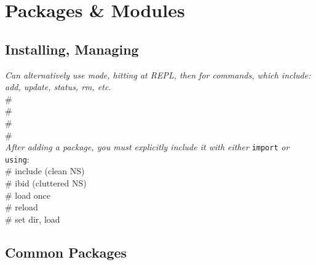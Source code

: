 \section{Packages \& Modules}

\subsection*{Installing, Managing}
\textit{Can alternatively use  mode, hitting \say{]} at REPL, then  for commands, which include: add, update, status, rm, etc.}\\
 \#  \\
 \#  \\
 \#  \\
 \#  \\[1mm]
\textit{After adding a package, you must explicitly include it with either }\texttt{import}\textit{ or }\texttt{using}:\\
 \#  include (clean NS) \\
 \#  ibid (cluttered NS) \\
 \# load once \\
 \# reload \\
 \# set dir, load \\



\subsection*{Common Packages}

